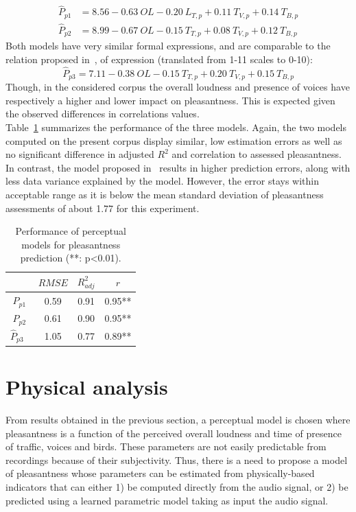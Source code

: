 \documentclass[11pt,a4paper]{article}
\begin{document}
\begin{align}
\hat P_{p1} &= 8.56 - 0.63~OL - 0.20~L_{T, p} + 0.11~T_{V, p} + 0.14~T_{B, p}\\
\hat P_{p2} &= 8.99 - 0.67~OL - 0.15~T_{T, p} + 0.08~T_{V, p} + 0.12~T_{B, p}
\end{align}
Both models have very similar formal expressions, and are comparable to the relation proposed in~\cite{ricciardi2014}, of expression (translated from 1-11 scales to 0-10):
\begin{equation}
\hat P_{p3} = 7.11 - 0.38~OL - 0.15~T_{T, p} + 0.20~T_{V, p} + 0.15~T_{B, p}
\end{equation}
Though, in the considered corpus the overall loudness and presence of voices have respectively a higher and lower impact on pleasantness. This is expected given the observed differences in correlations values.\\

Table~\ref{tab:percm} summarizes the performance of the three models. Again, the two models computed on the present corpus display similar, low estimation errors as well as no significant difference in adjusted $R^2$ and correlation to assessed pleasantness. In contrast, the model proposed in~\cite{ricciardi2014} results in higher prediction errors, along with less data variance explained by the model. However, the error stays within acceptable range as it is below the mean standard deviation of pleasantness assessments of about 1.77 for this experiment.


\begin{table}[h]
\centering
\caption{Performance of perceptual models for pleasantness prediction (**: p<0.01).}
\label{tab:percm}
\begin{tabular}{ c | c | c | c }
\hline
	 & $RMSE$ & $R^2_{adj}$ & $r$ \\ \hline
	$\hat P_{p1}$ & 0.59 & 0.91 & 0.95** \\
	$\hat P_{p2}$ & 0.61 & 0.90 & 0.95** \\
	$\hat P_{p3}$~\cite{ricciardi2014} & 1.05 & 0.77 & 0.89** \\ \hline
\end{tabular}
\end{table}

\section{Physical analysis}
\label{sec:phys}


From results obtained in the previous section, a perceptual model is chosen where pleasantness is a function of the perceived overall loudness and time of presence of traffic, voices and birds. These parameters are not easily predictable from recordings because of their subjectivity. Thus, there is a need to propose a model of pleasantness whose parameters can be estimated from physically-based indicators that can either 1) be computed directly from the audio signal, or 2) be predicted using a learned parametric model taking as input the audio signal.
\end{document}
